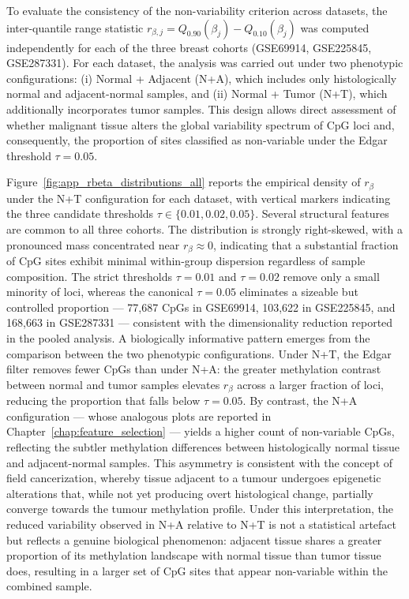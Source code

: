 To evaluate the consistency of the non-variability criterion across datasets, 
the inter-quantile range statistic 
$r_{\beta,j} = Q_{0.90}(\beta_j) - Q_{0.10}(\beta_j)$ 
was computed independently for each of the three breast cohorts 
(GSE69914, GSE225845, GSE287331). For each dataset, the analysis was 
carried out under two phenotypic configurations: 
(i) Normal + Adjacent (N+A), which includes only histologically normal 
and adjacent-normal samples, and (ii) Normal + Tumor (N+T), which 
additionally incorporates tumor samples. This design allows direct 
assessment of whether malignant tissue alters the global variability 
spectrum of CpG loci and, consequently, the proportion of sites 
classified as non-variable under the Edgar threshold 
$\tau = 0.05$.

Figure~\ref{fig:app_rbeta_distributions_all} reports the empirical density 
of $r_{\beta}$ under the N+T configuration for each dataset, with 
vertical markers indicating the three candidate thresholds 
$\tau \in \{0.01, 0.02, 0.05\}$. Several structural features are common 
to all three cohorts. The distribution is strongly right-skewed, with 
a pronounced mass concentrated near $r_{\beta} \approx 0$, indicating 
that a substantial fraction of CpG sites exhibit minimal within-group 
dispersion regardless of sample composition. The strict thresholds 
$\tau = 0.01$ and $\tau = 0.02$ remove only a small minority of loci, 
whereas the canonical $\tau = 0.05$ eliminates a sizeable but controlled 
proportion — 77,687 CpGs in GSE69914, 103,622 in GSE225845, and 
168,663 in GSE287331 — consistent with the dimensionality reduction 
reported in the pooled analysis.
A biologically informative pattern emerges from the comparison between 
the two phenotypic configurations. Under N+T, the Edgar filter removes 
fewer CpGs than under N+A: the greater methylation contrast between 
normal and tumor samples elevates $r_{\beta}$ across a larger fraction 
of loci, reducing the proportion that falls below $\tau = 0.05$. By 
contrast, the N+A configuration — whose analogous plots are reported in 
Chapter~\ref{chap:feature_selection} — yields a higher count of 
non-variable CpGs, reflecting the subtler methylation differences between 
histologically normal tissue and adjacent-normal samples. This asymmetry 
is consistent with the concept of field cancerization, whereby tissue 
adjacent to a tumour undergoes epigenetic alterations that, while not yet 
producing overt histological change, partially converge towards the tumour 
methylation profile. Under this interpretation, the reduced variability 
observed in N+A relative to N+T is not a statistical artefact but reflects 
a genuine biological phenomenon: adjacent tissue shares a greater proportion 
of its methylation landscape with normal tissue than tumor tissue does, 
resulting in a larger set of CpG sites that appear non-variable within the 
combined sample.

